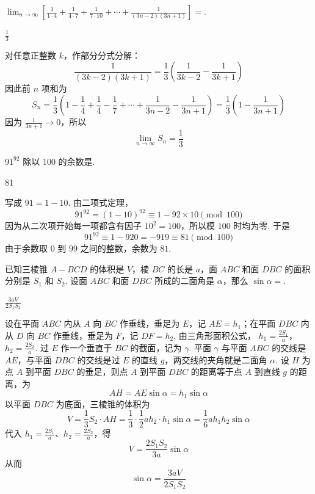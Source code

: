 \documentclass[UTF8,a4paper,oneside,11pt]{ctexbook}
\begin{document}
\begin{problem}
\(\displaystyle\lim_{n\to\infty}\left[ \frac{1}{1\cdot 4}+\frac{1}{4\cdot 7}+\frac{1}{7\cdot 10}+\cdots+\frac{1}{(3n-2)(3n+1)} \right]=\)\fillinblank{}.
\end{problem}

\begin{answer}
\(\frac13\)
\end{answer}

\begin{solution}
对任意正整数 \(k\)，作部分分式分解：
\[
\frac{1}{(3k-2)(3k+1)}=\frac13\left(\frac{1}{3k-2}-\frac{1}{3k+1}\right)
\]
因此前 \(n\) 项和为
\[
S_n=\frac13\left(1-\frac14+\frac14-\frac17+\cdots+\frac{1}{3n-2}-\frac{1}{3n+1}\right)=\frac13\left(1-\frac{1}{3n+1}\right)
\]
因为 \(\frac{1}{3n+1}\to0\)，所以
\[
\lim_{n\to\infty}S_n=\frac13
\]
\end{solution}

\begin{problem}
\(91^{92}\) 除以 \(100\) 的余数是\fillinblank{}.
\end{problem}

\begin{answer}
81
\end{answer}

\begin{solution}
写成 \(91=1-10\). 由二项式定理，
\[
91^{92}=(1-10)^{92}\equiv1-92\times10\pmod {100}
\]
因为从二次项开始每一项都含有因子 \(10^2=100\)，所以模 \(100\) 时均为零. 于是
\[
91^{92}\equiv1-920=-919\equiv81\pmod {100}
\]
由于余数取 \(0\) 到 \(99\) 之间的整数，余数为 \(81\).
\end{solution}

\begin{problem}
已知三棱锥 \(A-BCD\) 的体积是 \(V\)，棱 \(BC\) 的长是 \(a\)，面 \(ABC\) 和面 \(DBC\) 的面积分别是 \(S_1\) 和 \(S_2\). 设面 \(ABC\) 和面 \(DBC\) 所成的二面角是 \(\alpha\)，那么 \(\sin \alpha=\)\fillinblank{}.
\end{problem}

\begin{answer}
\(\frac{3aV}{2S_1S_2}\)
\end{answer}

\begin{solution}
设在平面 \(ABC\) 内从 \(A\) 向 \(BC\) 作垂线，垂足为 \(E\)，记 \(AE=h_1\)；在平面 \(DBC\) 内从 \(D\) 向 \(BC\) 作垂线，垂足为 \(F\)，记 \(DF=h_2\). 由三角形面积公式，
\(h_1=\frac{2S_1}{a}\)，\(h_2=\frac{2S_2}{a}\).
过 \(E\) 作一个垂直于 \(BC\) 的截面，记为 \(\gamma\). 平面 \(\gamma\) 与平面 \(ABC\) 的交线是 \(AE\)，与平面 \(DBC\) 的交线是过 \(E\) 的直线 \(g\)，两交线的夹角就是二面角 \(\alpha\). 设 \(H\) 为点 \(A\) 到平面 \(DBC\) 的垂足，则点 \(A\) 到平面 \(DBC\) 的距离等于点 \(A\) 到直线 \(g\) 的距离，为
\[
AH=AE\sin\alpha=h_1\sin\alpha
\]
以平面 \(DBC\) 为底面，三棱锥的体积为
\[
V=\frac13S_2\cdot AH=\frac13\cdot\frac12ah_2\cdot h_1\sin\alpha
=\frac16ah_1h_2\sin\alpha
\]
代入 \(h_1=\frac{2S_1}{a}\)、\(h_2=\frac{2S_2}{a}\)，得
\[
V=\frac{2S_1S_2}{3a}\sin\alpha
\]
从而
\[
\sin\alpha=\frac{3aV}{2S_1S_2}
\]
\end{solution}
\end{document}
